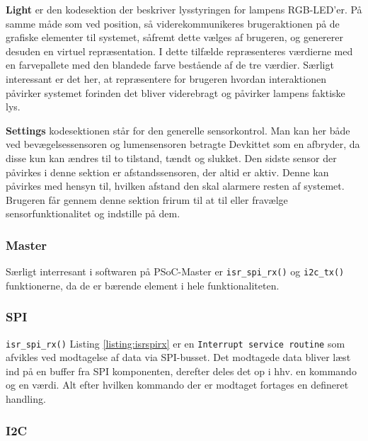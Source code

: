 \textbf{Light} er den kodesektion der beskriver lysstyringen for lampens RGB-LED'er. På samme måde som ved position, så viderekommunikeres brugeraktionen på de grafiske elementer til systemet, såfremt dette vælges af brugeren, og genererer desuden en virtuel repræsentation. I dette tilfælde repræsenteres værdierne med en farvepallete med den blandede farve bestående af de tre værdier. Særligt interessant er det her, at repræsentere for brugeren hvordan interaktionen påvirker systemet forinden det bliver viderebragt og påvirker lampens faktiske lys.

\textbf{Settings} kodesektionen står for den generelle sensorkontrol. Man kan her både ved bevægelsessensoren og lumensensoren betragte Devkittet som en afbryder, da disse kun kan ændres til to tilstand, tændt og slukket. Den sidste sensor der påvirkes i denne sektion er afstandssensoren, der altid er aktiv. Denne kan påvirkes med hensyn til, hvilken afstand den skal alarmere resten af systemet. Brugeren får gennem denne sektion frirum til at til eller fravælge sensorfunktionalitet og indstille på dem.

\subsubsection{Master}

Særligt interresant i softwaren på PSoC-Master er \verb+isr_spi_rx()+ og \verb+i2c_tx()+ funktionerne, da de er bærende element i hele funktionaliteten.

\subsubsection{SPI}



\verb+isr_spi_rx()+ Listing \ref{listing:isrspirx} er en \verb+Interrupt service routine+ som afvikles ved modtagelse af data via SPI-busset. Det modtagede data bliver læst ind på en buffer fra SPI komponenten, derefter deles det op i hhv. en kommando og en værdi. Alt efter hvilken kommando der er modtaget fortages en defineret handling. 


\subsubsection{I2C}



